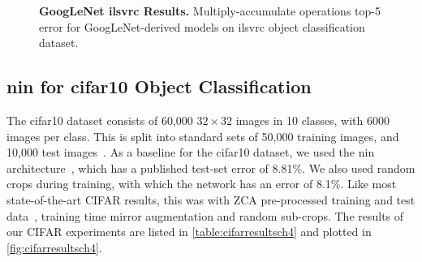\documentclass[thesis]{subfiles}
\begin{document}
    \begin{figure}[tbp] 
        \centering
        \datatable
        
        
        \caption[Low-Rank GoogLeNet \gls{ilsvrc} results]{\textbf{GoogLeNet \gls{ilsvrc} Results.} Multiply-accumulate operations \vs top-5 error for GoogLeNet-derived models on \gls{ilsvrc} object classification dataset.}
        \label{fig:googlenetimagenetresultsch4}
    \end{figure}
    
    \subsection{\gls{nin} for \gls{cifar10} Object Classification}
    The \gls{cifar10} dataset consists of 60,000 $32\times 32$ images in 10 classes, with 6000 images per class. This is split into standard sets of 50,000 training images, and 10,000 test images~\citep{CIFAR10}. As a baseline for the \gls{cifar10} dataset, we used the \gls{nin} architecture~\citep{Lin2013NiN}, which has a published test-set error of 8.81\%. We also used random crops during training, with which the network has an error of 8.1\%. Like most state-of-the-art CIFAR results, this was with ZCA pre-processed training and test data~\citep{goodfellow2013maxout}, training time mirror augmentation and random sub-crops. The results of our CIFAR experiments are listed in \cref{table:cifarresultsch4} and plotted in \cref{fig:cifarresultsch4}.
    
\end{document}

